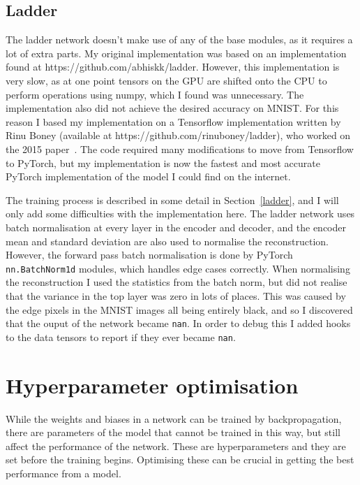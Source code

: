 \documentclass[12pt,a4paper,twoside,openright]{report}
\begin{document}
\subsection{Ladder}

The ladder network doesn't make use of any of the base modules, as it requires a lot of extra parts. My original implementation 
was based on an implementation found at https://github.com/abhiskk/ladder. However, this implementation is very slow, as at one point 
tensors on the GPU are shifted onto the CPU to perform operations using numpy, which I found was unnecessary. The implementation also did 
not achieve the desired accuracy on MNIST. For this reason I based my implementation on a Tensorflow implementation written by Rinu Boney
(available at https://github.com/rinuboney/ladder), who worked on 
the 2015 paper~\cite{DBLP:journals/corr/RasmusVHBR15}. The code required many modifications to move from Tensorflow to PyTorch,
but my implementation is now the fastest and most accurate PyTorch implementation of the model I could find on the internet.

The training process is described in some detail in Section~\ref{ladder}, and I will only add some difficulties with the implementation 
here. The ladder network uses batch normalisation at every layer in the encoder and decoder, and the encoder mean and standard deviation
are also used to normalise the reconstruction. However, the forward pass batch normalisation is done by PyTorch \texttt{nn.BatchNorm1d}
modules, which handles edge cases correctly. When normalising the reconstruction I used the statistics from the batch norm, but did 
not realise that the variance in the top layer was zero in lots of places. This was caused by the edge pixels in the MNIST images all 
being entirely black, and so I discovered that the ouput of the network became \texttt{nan}. In order to debug this I added hooks to the
data tensors to report if they ever became \texttt{nan}.

\section{Hyperparameter optimisation} \label{hyper}
While the weights and biases in a network can be trained by backpropagation, there are parameters of the model that cannot be trained in 
this way, but still affect the performance of the network. These are hyperparameters and they are set before the training begins. 
Optimising these can be crucial in getting the best performance from a model.
\end{document}
